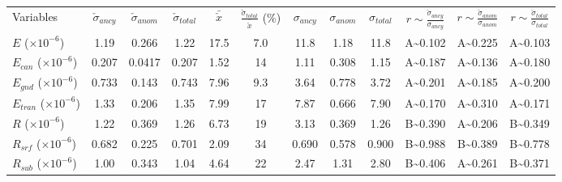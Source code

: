 \setlength{\tabcolsep}{3pt}
\begin{tabular}{lccccccccccc}
    \tophline
    Variables                           & \(\check{\sigma}_{ancy}\)  & \(\check{\sigma}_{anom}\) & \(\check{\sigma}_{total}\)
                                        & \(\bar{\check{x}}\) & \(\frac{\check{\sigma}_{total}}{\bar{\check{x}}}\) (\%)
                                        & \(\sigma_{ancy}\)          & \(\sigma_{anom}\)         & \(\sigma_{total}\)
                                        & \(r\sim\frac{\check{\sigma}_{ancy}}{\sigma_{ancy}}\)
                                        & \(r\sim\frac{\check{\sigma}_{anom}}{\sigma_{anom}}\)
                                        & \(r\sim\frac{\check{\sigma}_{total}}{\sigma_{total}}\)  \\
    \middlehline
    \(E\) (\(\times 10^{-6}\))          & \num{1.19}   & \num{0.266}  & \num{1.22}  & \num{17.5}     & \num{7.0} & \num{11.8}  & \num{1.18}  & \num{11.8} & A\textasciitilde\num{0.102} & A\textasciitilde\num{0.225} & A\textasciitilde\num{0.103} \\
    \(E_{can}\) (\(\times 10^{-6}\))    & \num{0.207}  & \num{0.0417} & \num{0.207} & \num{1.52}     & \num{14}  & \num{1.11}  & \num{0.308} & \num{1.15} & A\textasciitilde\num{0.187} & A\textasciitilde\num{0.136} & A\textasciitilde\num{0.180} \\
    \(E_{gnd}\) (\(\times 10^{-6}\))    & \num{0.733}  & \num{0.143}  & \num{0.743} & \num{7.96}     & \num{9.3} & \num{3.64}  & \num{0.778} & \num{3.72} & A\textasciitilde\num{0.201} & A\textasciitilde\num{0.185} & A\textasciitilde\num{0.200} \\
    \(E_{tran}\) (\(\times 10^{-6}\))   & \num{1.33}   & \num{0.206}  & \num{1.35}  & \num{7.99}     & \num{17}  & \num{7.87}  & \num{0.666} & \num{7.90} & A\textasciitilde\num{0.170} & A\textasciitilde\num{0.310} & A\textasciitilde\num{0.171} \\
    \(R\) (\(\times 10^{-6}\))          & \num{1.22}   & \num{0.369}  & \num{1.26}  & \num{6.73}     & \num{19}  & \num{3.13}  & \num{0.369} & \num{1.26} & B\textasciitilde\num{0.390} & A\textasciitilde\num{0.206} & B\textasciitilde\num{0.349} \\
    \(R_{srf}\) (\(\times 10^{-6}\))    & \num{0.682}  & \num{0.225}  & \num{0.701} & \num{2.09}     & \num{34}  & \num{0.690} & \num{0.578} & \num{0.900}& B\textasciitilde\num{0.988} & B\textasciitilde\num{0.389} & B\textasciitilde\num{0.778} \\
    \(R_{sub}\) (\(\times 10^{-6}\))    & \num{1.00}   & \num{0.343}  & \num{1.04}  & \num{4.64}     & \num{22}  & \num{2.47}  & \num{1.31}  & \num{2.80} & B\textasciitilde\num{0.406} & A\textasciitilde\num{0.261} & B\textasciitilde\num{0.371} \\

\end{tabular}
